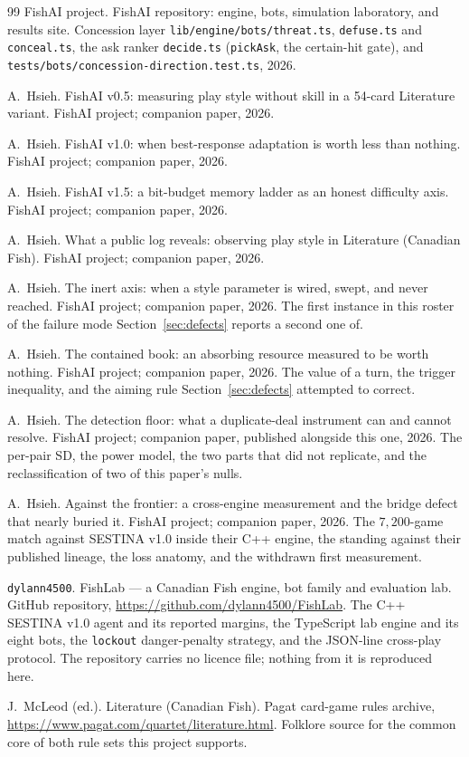 \documentclass[11pt]{article}
\newcommand{\code}[1]{\texttt{#1}}
\begin{document}
\begin{thebibliography}{99}
FishAI project. FishAI repository: engine, bots, simulation laboratory, and results site. Concession
layer \code{lib/engine/bots/threat.ts}, \code{defuse.ts} and \code{conceal.ts}, the ask ranker
\code{decide.ts} (\code{pickAsk}, the certain-hit gate), and
\code{tests/bots/concession-direction.test.ts}, 2026.

A.~Hsieh. FishAI v0.5: measuring play style without skill in a 54-card Literature variant. FishAI
project; companion paper, 2026.

A.~Hsieh. FishAI v1.0: when best-response adaptation is worth less than nothing. FishAI project;
companion paper, 2026.

A.~Hsieh. FishAI v1.5: a bit-budget memory ladder as an honest difficulty axis. FishAI project;
companion paper, 2026.

A.~Hsieh. What a public log reveals: observing play style in Literature (Canadian Fish). FishAI
project; companion paper, 2026.

A.~Hsieh. The inert axis: when a style parameter is wired, swept, and never reached. FishAI project;
companion paper, 2026. The first instance in this roster of the failure mode
Section~\ref{sec:defects} reports a second one of.

A.~Hsieh. The contained book: an absorbing resource measured to be worth nothing. FishAI project;
companion paper, 2026. The value of a turn, the trigger inequality, and the aiming rule
Section~\ref{sec:defects} attempted to correct.

A.~Hsieh. The detection floor: what a duplicate-deal instrument can and cannot resolve. FishAI
project; companion paper, published alongside this one, 2026. The per-pair SD, the power model, the
two parts that did not replicate, and the reclassification of two of this paper's nulls.

A.~Hsieh. Against the frontier: a cross-engine measurement and the bridge defect that nearly buried
it. FishAI project; companion paper, 2026. The $7{,}200$-game match against SESTINA v1.0 inside
their C++ engine, the standing against their published lineage, the loss anatomy, and the withdrawn
first measurement.

\code{dylann4500}. FishLab --- a Canadian Fish engine, bot family and evaluation lab. GitHub
repository, \url{https://github.com/dylann4500/FishLab}. The C++ SESTINA v1.0 agent and its
reported margins, the TypeScript lab engine and its eight bots, the \code{lockout} danger-penalty
strategy, and the JSON-line cross-play protocol. The repository carries no licence file; nothing
from it is reproduced here.

J.~McLeod (ed.). Literature (Canadian Fish). Pagat card-game rules archive,
\url{https://www.pagat.com/quartet/literature.html}. Folklore source for the common core of both
rule sets this project supports.

\end{thebibliography}
\end{document}
